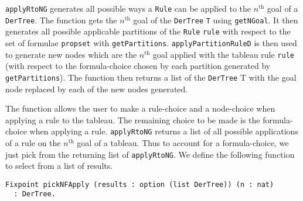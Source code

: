 \documentclass{llncs}
\begin{document}
%
\verb+applyRtoNG+ generates all possible ways a \verb+Rule+ can be applied to
the $n^{\textrm{th}}$ goal of a \verb+DerTree+. The function gets the
$n^{\textrm{th}}$ goal of the \verb+DerTree+ \verb+T+ using \verb+getNGoal+. It
then generates all possible applicable partitions of the \verb+Rule+
\verb+rule+ with respect to the set of formulae \verb+propset+ with
\verb+getPartitions+.  \verb+applyPartitionRuleD+ is then used to generate new
nodes which are the $n^{\textrm{th}}$ goal applied with the tableau rule
\verb+rule+ (with respect to the formula-choice chosen by each partition
generated by \verb+getPartitions+). The function then returns a list of the
\verb+DerTree+ T with the goal node replaced by each of the new nodes
generated.

The function allows the user to make a rule-choice and a node-choice when
applying a rule to the tableau. The remaining choice to be made is the
formula-choice when applying a rule. \verb+applyRtoNG+ returns a list of all
possible applications of a rule on the $n^{\textrm{th}}$ goal of a tableau.
Thus to account for a formula-choice, we just pick from the returning list of
\verb+applyRtoNG+. We define the following function to select from a list of
results.
%
\begin{verbatim}
Fixpoint pickNFApply (results : option (list DerTree)) (n : nat)
  : DerTree.
\end{verbatim}
%
\end{document}
